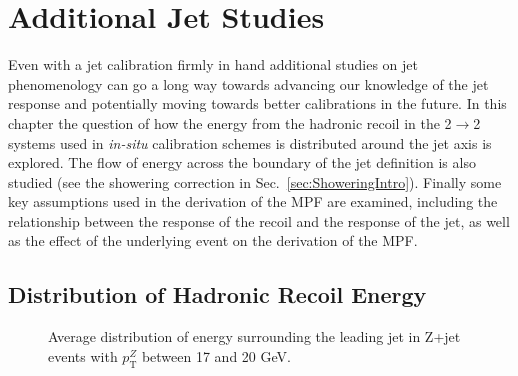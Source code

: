 \chapter{Additional Jet Studies}

Even with a jet calibration firmly in hand additional studies on jet phenomenology can go a long way towards advancing our knowledge of the jet response and potentially moving towards better calibrations in the future.  
In this chapter the question of how the energy from the hadronic recoil in the 2$\rightarrow$2 systems used in \textit {in-situ} calibration schemes is distributed around the jet axis is explored.  
The flow of energy across the boundary of the jet definition is also studied (see the showering correction in Sec.~\ref{sec:ShoweringIntro}).  
Finally some key assumptions used in the derivation of the MPF are examined, including the relationship between the response of the recoil and the response of the jet, as well as the effect of the underlying event on the derivation of the MPF.  

\section{Distribution of Hadronic Recoil Energy}
\begin{figure}[!ht]
 \begin{center}
 \end{center}
 \caption[Recoil energy distribution in Z+jet, 17-20 GeV]
 {\small Average distribution of energy surrounding the leading jet in Z+jet events with $p_{\mathrm T}^{Z}$ between 17 and 20 GeV. }
 \label{Fig:EMShape17-20}
\end{figure}

